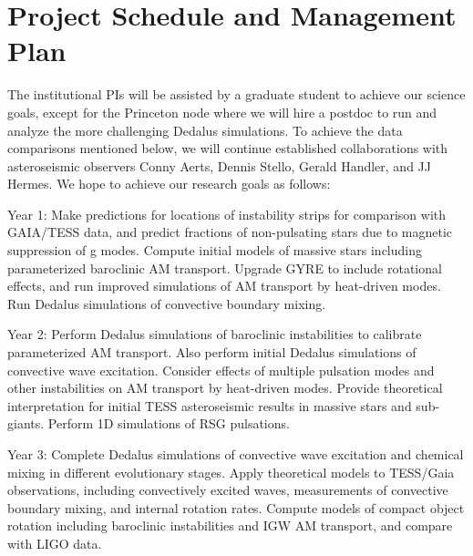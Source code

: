\section{Project Schedule and Management Plan}

The institutional PIs will be assisted by a graduate student to achieve our science goals, except for the Princeton node where we will hire a postdoc to run and analyze the more challenging Dedalus simulations. To achieve the data comparisons mentioned below, we will continue established collaborations with asteroseismic observers Conny Aerts, Dennis Stello, Gerald Handler, and JJ Hermes. We hope to achieve our research goals as follows:

Year 1: Make predictions for locations of instability strips for comparison with GAIA/TESS data, and predict fractions of non-pulsating stars due to magnetic suppression of g modes. Compute initial models of massive stars including parameterized baroclinic AM transport. Upgrade GYRE to include rotational effects, and run improved simulations of AM transport by heat-driven modes. Run Dedalus simulations of convective boundary mixing.

Year 2: Perform Dedalus simulations of baroclinic instabilities to calibrate parameterized AM transport. Also perform initial Dedalus simulations of convective wave excitation. Consider effects of multiple pulsation modes and other instabilities on AM transport by heat-driven modes. Provide theoretical interpretation for initial TESS asteroseismic results in massive stars and sub-giants. Perform 1D simulations of RSG pulsations.

Year 3: Complete Dedalus simulations of convective wave excitation and chemical mixing in different evolutionary stages. Apply theoretical models to TESS/Gaia observations, including convectively excited waves, measurements of convective boundary mixing, and internal rotation rates. Compute models of compact object rotation including baroclinic instabilities and IGW AM transport, and compare with LIGO data.

